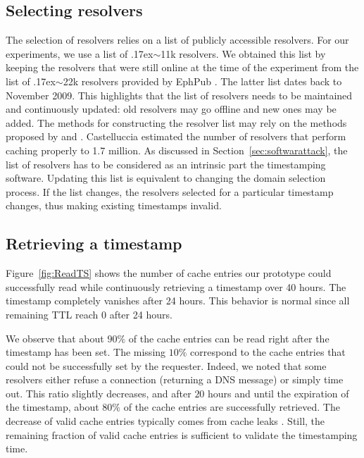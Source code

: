 \subsection{Selecting resolvers}
\label{sec:selectDNSres}
The selection of resolvers relies on a list of publicly accessible resolvers.
For our experiments, we use a list of {\raise.17ex\hbox{$\scriptstyle\sim$}}11k resolvers.
We obtained this list by keeping the resolvers that were still online at the time of the experiment from the list of {\raise.17ex\hbox{$\scriptstyle\sim$}}22k resolvers provided by EphPub \cite{Castelluccia2011}.
The latter list dates back to November 2009.
This highlights that the list of resolvers needs to be maintained and continuously updated: old resolvers may go offline and new ones may be added.
The methods for constructing the resolver list may rely on the methods proposed by \cite{Dagon2008} and \cite{Castelluccia2011}. Castelluccia \etal \cite{Castelluccia2011} estimated the number of resolvers that perform caching properly to 1.7 million.
As discussed in Section~\ref{sec:softwarattack}, the list of resolvers has to be considered as an intrinsic part the timestamping software. Updating this list is equivalent to changing the domain selection process. If the list changes, the resolvers selected for a particular timestamp changes, thus making existing timestamps invalid.

\subsection{Retrieving a timestamp}
Figure~\ref{fig:ReadTS} shows the number of cache entries our prototype could successfully read while continuously retrieving a timestamp over 40 hours. The timestamp completely vanishes after 24 hours. This behavior is normal since all remaining TTL reach 0 after 24 hours.

We observe that about $90\%$ of the cache entries can be read right after the timestamp has been set. The missing $10\%$ correspond to the cache entries that could not be successfully set by the requester. Indeed, we noted that some resolvers either refuse a connection (returning a DNS  message) or simply time out. This ratio slightly decreases, and after $20$ hours and until the expiration of the timestamp, about $80\%$ of the cache entries are successfully retrieved. The decrease of valid cache entries typically comes from cache leaks \cite{Kumar1993}. Still, the remaining fraction of valid cache entries is sufficient to validate the timestamping time.



